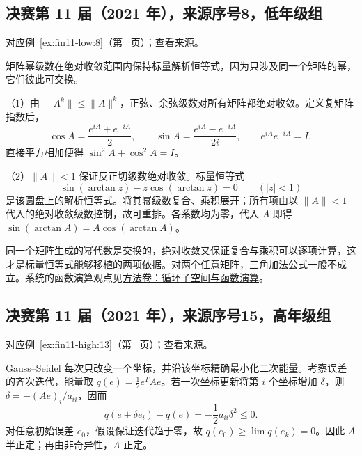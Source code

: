 \documentclass[UTF8,12pt,a4paper,fontset=fandol]{ctexart}
\begin{document}
\subsection{决赛第 11 届（2021 年），来源序号8，低年级组}\label{ans:fin11-low:8}\label{pr:fin11-low:8}

对应例~\ref{ex:fin11-low:8}（第~\pageref{ex:fin11-low:8} 页）；\href{https://github.com/lzxcr/cmc-mathematics/blob/64916fa1fdbc3e444a652eca204d5669058ee321/src/problems/finals/11/08.md}{查看来源}。

\begin{solve}

矩阵幂级数在绝对收敛范围内保持标量解析恒等式，因为只涉及同一个矩阵的幂，它们彼此可交换。

（1）由 $\|A^k\|\leq\|A\|^k$，正弦、余弦级数对所有矩阵都绝对收敛。定义复矩阵指数后，
\[
\cos A=\frac{e^{iA}+e^{-iA}}2,\qquad\sin A=\frac{e^{iA}-e^{-iA}}{2i},\qquad e^{iA}e^{-iA}=I,
\]
直接平方相加便得 $\sin^2A+\cos^2A=I$。

（2）$\|A\|<1$ 保证反正切级数绝对收敛。标量恒等式
\[
\sin(\arctan z)-z\cos(\arctan z)=0\qquad(|z|<1)
\]
是该圆盘上的解析恒等式。将其幂级数复合、乘积展开；所有项由以 $\|A\|<1$ 代入的绝对收敛级数控制，故可重排。各系数均为零，代入 $A$ 即得 $\sin(\arctan A)=A\cos(\arctan A)$。

\end{solve}

\begin{remark}[方法与条件]

同一个矩阵生成的幂代数是交换的，绝对收敛又保证复合与乘积可以逐项计算，这才是标量恒等式能够移植的两项依据。对两个任意矩阵，三角加法公式一般不成立。系统的函数演算观点见\hyperref[app:linear-cyclic]{方法卷：循环子空间与函数演算}。

\end{remark}

\subsection{决赛第 11 届（2021 年），来源序号15，高年级组}\label{ans:fin11-high:13}\label{pr:fin11-high:13}

对应例~\ref{ex:fin11-high:13}（第~\pageref{ex:fin11-high:13} 页）；\href{https://github.com/lzxcr/cmc-mathematics/blob/64916fa1fdbc3e444a652eca204d5669058ee321/src/problems/finals/11/15.md}{查看来源}。

\begin{solve}

Gauss--Seidel 每次只改变一个坐标，并沿该坐标精确最小化二次能量。考察误差的齐次迭代，能量取 $q(e)=\frac12e^TAe$。若一次坐标更新将第 $i$ 个坐标增加 $\delta$，则 $\delta=-(Ae)_i/a_{ii}$，因而
\[
q(e+\delta e_i)-q(e)=-\frac12a_{ii}\delta^2\leq0.
\]
对任意初始误差 $e_0$，假设保证迭代趋于零，故 $q(e_0)\geq\lim q(e_k)=0$。因此 $A$ 半正定；再由非奇异性，$A$ 正定。

\end{solve}
\end{document}
